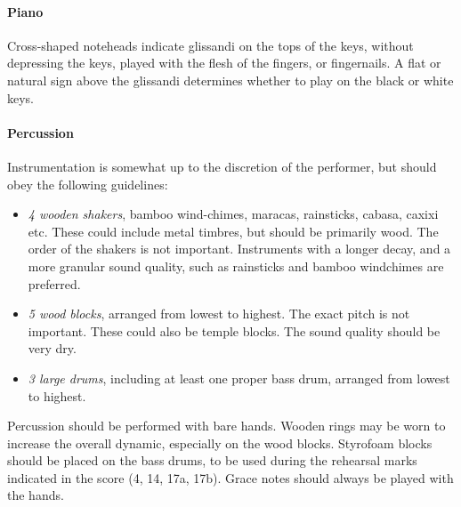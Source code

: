 \documentclass[11pt]{report}
\begin{document}
\begin{titlepage}
\begin{multicols}{2}
{    \paragraph{Piano}

    Cross-shaped noteheads indicate glissandi on the tops of the keys, without
    depressing the keys, played with the flesh of the fingers, or fingernails.
    A flat or natural sign above the glissandi determines whether to play on
    the black or white keys.

    \paragraph{Percussion}
    
    Instrumentation is somewhat up to the discretion of the performer, but
    should obey the following guidelines:

    \begin{itemize}
        
        \item \emph{4 wooden shakers}, bamboo wind-chimes, maracas, rainsticks,
        cabasa, caxixi etc. These could include metal timbres, but should be
        primarily wood. The order of the shakers is not important.  Instruments
        with a longer decay, and a more granular sound quality, such as
        rainsticks and bamboo windchimes are preferred.

        \item \emph{5 wood blocks}, arranged from lowest to highest.  The
        exact pitch is not important. These could also be temple blocks. The
        sound quality should be very dry.

        \item \emph{3 large drums}, including at least one proper bass drum,
        arranged from lowest to highest.

    \end{itemize}

    Percussion should be performed with bare hands. Wooden rings may be worn to
    increase the overall dynamic, especially on the wood blocks. Styrofoam
    blocks should be placed on the bass drums, to be used during the rehearsal
    marks indicated in the score (4, 14, 17a, 17b). Grace notes should always
    be played with the hands.
    
}

\end{multicols}
\end{titlepage}
\end{document}
